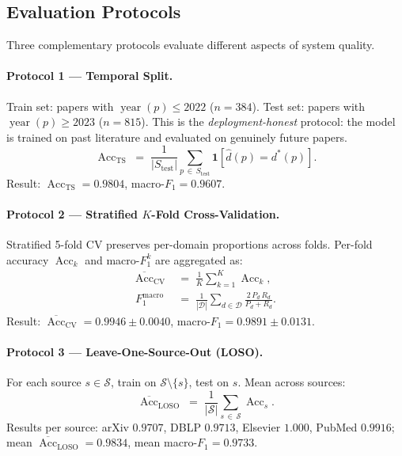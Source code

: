 \documentclass[letterpaper]{article}
\theoremstyle{plain}
\theoremstyle{definition}
\theoremstyle{remark}
\newcommand{\D}{\mathcal{D}}
\newcommand{\yd}[1]{\operatorname{year}(#1)}
\newcommand{\I}[1]{\mathbf{1}\!\left[#1\right]}
\begin{document}
\subsection{Evaluation Protocols}
\label{sec:eval}

Three complementary protocols evaluate different
aspects of system quality.

\paragraph{Protocol 1 --- Temporal Split.}
Train set: papers with $\yd{p} \leq 2022$ ($n = 384$).
Test set: papers with $\yd{p} \geq 2023$ ($n = 815$).
This is the \emph{deployment-honest} protocol:
the model is trained on past literature and evaluated
on genuinely future papers.
\begin{equation}
    \operatorname{Acc}_{\mathrm{TS}}
    \;=\;
    \frac{1}{|S_{\mathrm{test}}|}
    \sum_{p \,\in\, S_{\mathrm{test}}}
    \I{\hat{d}(p) = d^*(p)}.
    \label{eq:ts}
\end{equation}
Result: $\operatorname{Acc}_{\mathrm{TS}} = 0.9804$,
macro-$F_1 = 0.9607$.

\paragraph{Protocol 2 --- Stratified $K$-Fold
Cross-Validation.}
Stratified 5-fold CV preserves per-domain proportions
across folds.
Per-fold accuracy $\operatorname{Acc}_k$ and macro-$F_1^k$
are aggregated as:
\begin{align}
    \overline{\operatorname{Acc}}_{\mathrm{CV}}
    &\;=\;
    \frac{1}{K}\sum_{k=1}^{K}\operatorname{Acc}_k,
    \label{eq:cv_acc} \\
    F_1^{\mathrm{macro}}
    &\;=\;
    \frac{1}{|\D|}
    \sum_{d \in \D}
    \frac{2\,P_d\,R_d}{P_d + R_d}.
    \label{eq:macro_f1}
\end{align}
Result: $\overline{\operatorname{Acc}}_{\mathrm{CV}}
= 0.9946 \pm 0.0040$,
macro-$F_1 = 0.9891 \pm 0.0131$.

\paragraph{Protocol 3 --- Leave-One-Source-Out (LOSO).}
For each source $s \in \mathcal{S}$, train on
$\mathcal{S} \setminus \{s\}$, test on $s$.
Mean across sources:
\begin{equation}
    \overline{\operatorname{Acc}}_{\mathrm{LOSO}}
    \;=\;
    \frac{1}{|\mathcal{S}|}
    \sum_{s \,\in\, \mathcal{S}}
    \operatorname{Acc}_s.
    \label{eq:loso}
\end{equation}
Results per source:
arXiv $0.9707$, DBLP $0.9713$,
Elsevier $1.000$, PubMed $0.9916$;
mean $\overline{\operatorname{Acc}}_{\mathrm{LOSO}} = 0.9834$,
mean macro-$F_1 = 0.9733$.
\end{document}
